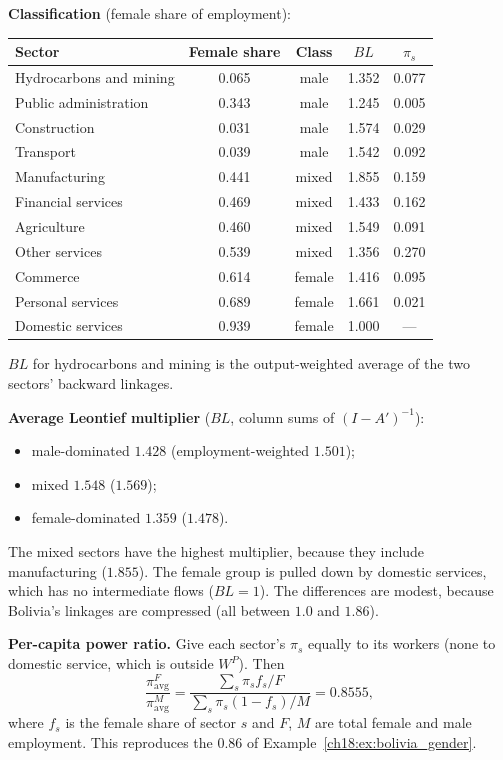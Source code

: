 \documentclass[../solutions_manual.tex]{subfiles}
\begin{document}
 \textbf{Classification} (female share of employment):
\begin{center}
\small
\begin{tabular}{lcccc}
\toprule
Sector & Female share & Class & $BL$ & $\pi_s$ \\
\midrule
Hydrocarbons and mining & 0.065 & male & 1.352 & 0.077 \\
Public administration & 0.343 & male & 1.245 & 0.005 \\
Construction & 0.031 & male & 1.574 & 0.029 \\
Transport & 0.039 & male & 1.542 & 0.092 \\
Manufacturing & 0.441 & mixed & 1.855 & 0.159 \\
Financial services & 0.469 & mixed & 1.433 & 0.162 \\
Agriculture & 0.460 & mixed & 1.549 & 0.091 \\
Other services & 0.539 & mixed & 1.356 & 0.270 \\
Commerce & 0.614 & female & 1.416 & 0.095 \\
Personal services & 0.689 & female & 1.661 & 0.021 \\
Domestic services & 0.939 & female & 1.000 & --- \\
\bottomrule
\end{tabular}
\end{center}
$BL$ for hydrocarbons and mining is the output-weighted average of the two sectors' backward linkages.

 \textbf{Average Leontief multiplier} ($BL$, column sums of $(I - A')^{-1}$):
\begin{itemize}
\item male-dominated $1.428$ (employment-weighted $1.501$);
\item mixed $1.548$ ($1.569$);
\item female-dominated $1.359$ ($1.478$).
\end{itemize}
The mixed sectors have the highest multiplier, because they include manufacturing ($1.855$). The female group is pulled down by domestic services, which has no intermediate flows ($BL = 1$). The differences are modest, because Bolivia's linkages are compressed (all between $1.0$ and $1.86$).

 \textbf{Per-capita power ratio.} Give each sector's $\pi_s$ equally to its workers (none to domestic service, which is outside $W^P$). Then
\[
\frac{\pi^F_{\text{avg}}}{\pi^M_{\text{avg}}} = \frac{\sum_s \pi_s f_s/F}{\sum_s \pi_s(1 - f_s)/M} = 0.8555,
\]
where $f_s$ is the female share of sector $s$ and $F$, $M$ are total female and male employment. This reproduces the $0.86$ of Example~\ref{ch18:ex:bolivia_gender}.
\end{document}

